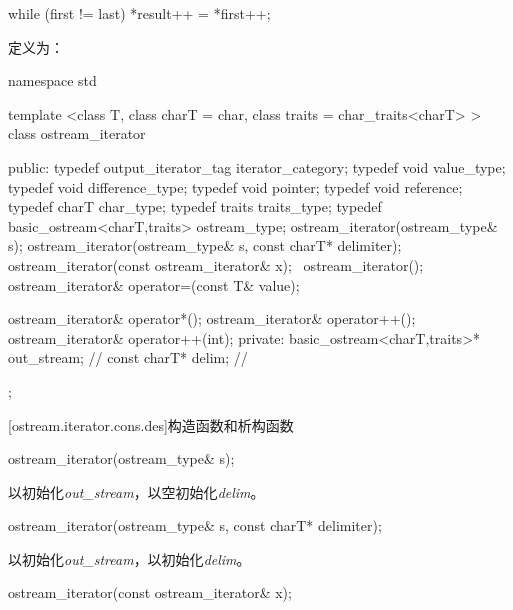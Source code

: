 \begin{codeblock}
while (first != last)
  *result++ = *first++;
\end{codeblock}

\pnum
{}定义为：

\begin{codeblock}
namespace std {
  template <class T, class charT = char, class traits = char_traits<charT> >
  class ostream_iterator {
  public:
    typedef output_iterator_tag iterator_category;
    typedef void value_type;
    typedef void difference_type;
    typedef void pointer;
    typedef void reference;
    typedef charT char_type;
    typedef traits traits_type;
    typedef basic_ostream<charT,traits> ostream_type;
    ostream_iterator(ostream_type& s);
    ostream_iterator(ostream_type& s, const charT* delimiter);
    ostream_iterator(const ostream_iterator& x);
   ~ostream_iterator();
    ostream_iterator& operator=(const T& value);

    ostream_iterator& operator*();
    ostream_iterator& operator++();
    ostream_iterator& operator++(int);
  private:
    basic_ostream<charT,traits>* out_stream;  // \expos
    const charT* delim;                       // \expos
  };
}
\end{codeblock}

[ostream.iterator.cons.des]{构造函数和析构函数}


%
\begin{itemdecl}
ostream_iterator(ostream_type& s);
\end{itemdecl}

\begin{itemdescr}
\pnum
\effects
以初始化\textit{out_stream}，以空初始化\textit{delim}。
\end{itemdescr}


%
\begin{itemdecl}
ostream_iterator(ostream_type& s, const charT* delimiter);
\end{itemdecl}

\begin{itemdescr}
\pnum
\effects
以初始化\textit{out_stream}，以初始化\textit{delim}。
\end{itemdescr}


%
\begin{itemdecl}
ostream_iterator(const ostream_iterator& x);
\end{itemdecl}

